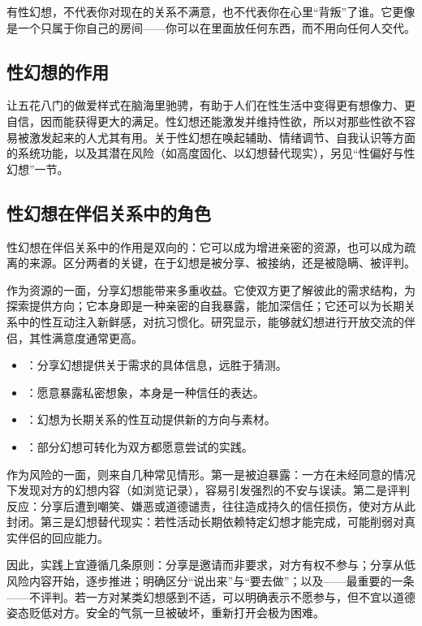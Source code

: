 \begin{tcolorbox}[colback=pink!5!white,colframe=red!50!black,title=贴心小叮咛]
有性幻想，不代表你对现在的关系不满意，也不代表你在心里“背叛”了谁。它更像是一个只属于你自己的房间——你可以在里面放任何东西，而不用向任何人交代。
\end{tcolorbox}

\subsection{性幻想的作用}

让五花八门的做爱样式在脑海里驰骋，有助于人们在性生活中变得更有想像力、更自信，因而能获得更大的满足。性幻想还能激发并维持性欲，所以对那些性欲不容易被激发起来的人尤其有用。关于性幻想在唤起辅助、情绪调节、自我认识等方面的系统功能，以及其潜在风险（如高度固化、以幻想替代现实），另见“性偏好与性幻想”一节。

\subsection{性幻想在伴侣关系中的角色}

性幻想在伴侣关系中的作用是双向的：它可以成为增进亲密的资源，也可以成为疏离的来源。区分两者的关键，在于幻想是被分享、被接纳，还是被隐瞒、被评判。

作为资源的一面，分享幻想能带来多重收益。它使双方更了解彼此的需求结构，为探索提供方向；它本身即是一种亲密的自我暴露，能加深信任；它还可以为长期关系中的性互动注入新鲜感，对抗习惯化。研究显示，能够就幻想进行开放交流的伴侣，其性满意度通常更高。

\begin{itemize}
  \item {}：分享幻想提供关于需求的具体信息，远胜于猜测。
  \item {}：愿意暴露私密想象，本身是一种信任的表达。
  \item {}：幻想为长期关系的性互动提供新的方向与素材。
  \item {}：部分幻想可转化为双方都愿意尝试的实践。
\end{itemize}

作为风险的一面，则来自几种常见情形。第一是被迫暴露：一方在未经同意的情况下发现对方的幻想内容（如浏览记录），容易引发强烈的不安与误读。第二是评判反应：分享后遭到嘲笑、嫌恶或道德谴责，往往造成持久的信任损伤，使对方从此封闭。第三是幻想替代现实：若性活动长期依赖特定幻想才能完成，可能削弱对真实伴侣的回应能力。

因此，实践上宜遵循几条原则：分享是邀请而非要求，对方有权不参与；分享从低风险内容开始，逐步推进；明确区分“说出来”与“要去做”；以及——最重要的一条——不评判。若一方对某类幻想感到不适，可以明确表示不愿参与，但不宜以道德姿态贬低对方。安全的气氛一旦被破坏，重新打开会极为困难。

